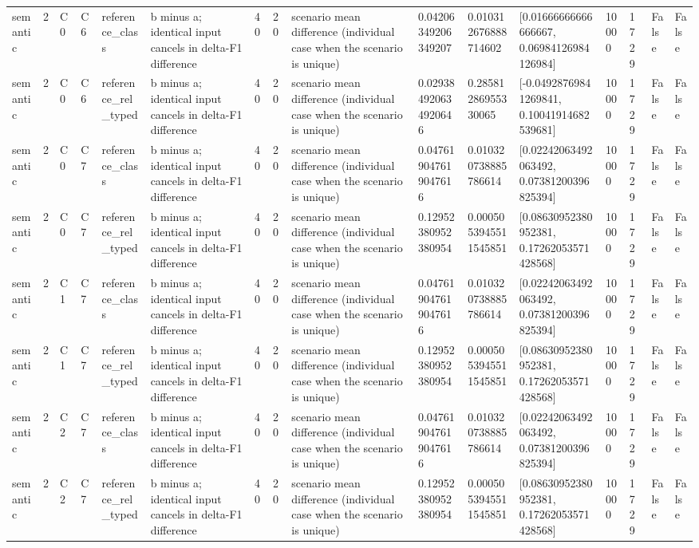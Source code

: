 \begin{tabular}{llllllllllllllll}
semantic & 2 & C0 & C6 & reference\_class & b minus a; identical input cancels in delta-F1 difference & 40 & 20 & scenario mean difference (individual case when the scenario is unique) & 0.04206349206349207 & 0.010312676888714602 & [0.01666666666666667, 0.06984126984126984] & 10000 & 1729 & False & False \\
semantic & 2 & C0 & C6 & reference\_rel\_typed & b minus a; identical input cancels in delta-F1 difference & 40 & 20 & scenario mean difference (individual case when the scenario is unique) & 0.029384920634920646 & 0.28581286955330065 & [-0.04928769841269841, 0.10041914682539681] & 10000 & 1729 & False & False \\
semantic & 2 & C0 & C7 & reference\_class & b minus a; identical input cancels in delta-F1 difference & 40 & 20 & scenario mean difference (individual case when the scenario is unique) & 0.047619047619047616 & 0.010320738885786614 & [0.02242063492063492, 0.07381200396825394] & 10000 & 1729 & False & False \\
semantic & 2 & C0 & C7 & reference\_rel\_typed & b minus a; identical input cancels in delta-F1 difference & 40 & 20 & scenario mean difference (individual case when the scenario is unique) & 0.12952380952380954 & 0.0005053945511545851 & [0.08630952380952381, 0.17262053571428568] & 10000 & 1729 & False & False \\
semantic & 2 & C1 & C7 & reference\_class & b minus a; identical input cancels in delta-F1 difference & 40 & 20 & scenario mean difference (individual case when the scenario is unique) & 0.047619047619047616 & 0.010320738885786614 & [0.02242063492063492, 0.07381200396825394] & 10000 & 1729 & False & False \\
semantic & 2 & C1 & C7 & reference\_rel\_typed & b minus a; identical input cancels in delta-F1 difference & 40 & 20 & scenario mean difference (individual case when the scenario is unique) & 0.12952380952380954 & 0.0005053945511545851 & [0.08630952380952381, 0.17262053571428568] & 10000 & 1729 & False & False \\
semantic & 2 & C2 & C7 & reference\_class & b minus a; identical input cancels in delta-F1 difference & 40 & 20 & scenario mean difference (individual case when the scenario is unique) & 0.047619047619047616 & 0.010320738885786614 & [0.02242063492063492, 0.07381200396825394] & 10000 & 1729 & False & False \\
semantic & 2 & C2 & C7 & reference\_rel\_typed & b minus a; identical input cancels in delta-F1 difference & 40 & 20 & scenario mean difference (individual case when the scenario is unique) & 0.12952380952380954 & 0.0005053945511545851 & [0.08630952380952381, 0.17262053571428568] & 10000 & 1729 & False & False \\

\end{tabular}

